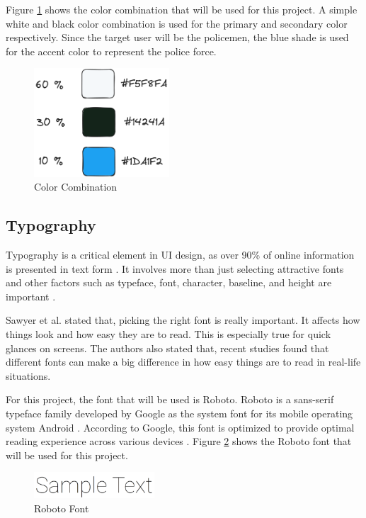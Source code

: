 Figure \ref{fig:color-combination} shows the color combination that will be used for this project. A simple white and black color combination is used for the primary and secondary color respectively. Since the target user will be the policemen, the blue shade is used for the accent color to represent the police force.

\begin{figure}[!ht]
    \centering
    \includegraphics[width=0.45\textwidth]{texs/Part2/chapter3/image/colorcombination.png}
    \caption{Color Combination}
    \label{fig:color-combination}
\end{figure}

\subsection{Typography}
Typography is a critical element in UI design, as over 90\% of online information is presented in text form \cite{Fitz-Patrick_2022}. It involves more than just selecting attractive fonts and other factors such as typeface, font, character, baseline, and height are important \cite{Fitz-Patrick_2022}.

Sawyer et al. \cite{Sawyer2020} stated that, picking the right font is really important. It affects how things look and how easy they are to read. This is especially true for quick glances on screens. The authors also stated that, recent studies found that different fonts can make a big difference in how easy things are to read in real-life situations.

For this project, the font that will be used is Roboto. Roboto is a sans-serif typeface family developed by Google as the system font for its mobile operating system Android \cite{Mott_2022}. According to Google, this font is optimized to provide optimal reading experience across various devices \cite{Mott_2022}. Figure \ref{fig:roboto} shows the Roboto font that will be used for this project.

\begin{figure}[!ht]
    \centering
    \includegraphics[width=0.4\textwidth]{texs/Part2/chapter3/image/roboto.png}
    \caption{Roboto Font}
    \label{fig:roboto}
\end{figure}

